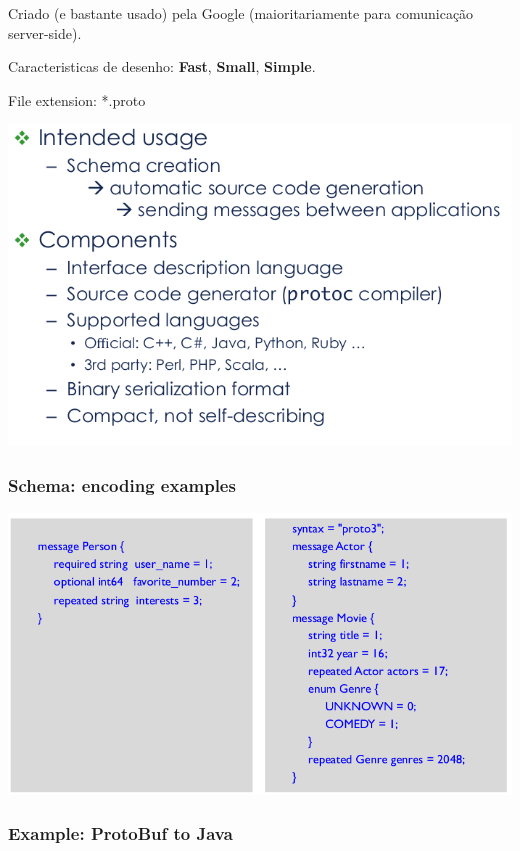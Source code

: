\documentclass{article}
\begin{document}
Criado (e bastante usado) pela Google (maioritariamente para comunicação server-side).

Caracteristicas de desenho: \textbf{Fast}, \textbf{Small}, \textbf{Simple}.

File extension: *.proto

\begin{center}
  \includegraphics[scale=0.3]{65}
\end{center}

\subsubsection*{Schema: encoding examples}

\begin{center}
  \includegraphics[scale=0.3]{66}
\end{center}

\pagebreak

\subsubsection*{Example: ProtoBuf to Java}
\end{document}
